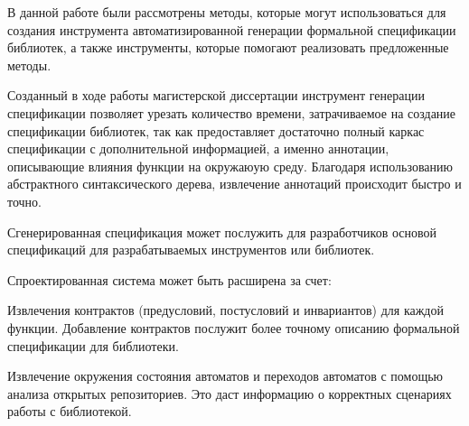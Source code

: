 \conclusion

В данной работе были рассмотрены методы, которые могут использоваться для создания инструмента автоматизированной генерации формальной спецификации библиотек, а также инструменты, которые помогают реализовать предложенные методы.

Созданный в ходе работы магистерской диссертации инструмент генерации спецификации позволяет урезать количество времени, затрачиваемое на создание спецификации библиотек, так как предоставляет достаточно полный каркас спецификации с дополнительной информацией, а именно аннотации, описывающие влияния функции на окружаюую среду.
Благодаря использованию абстрактного синтаксического дерева, извлечение аннотаций происходит быстро и точно.

Сгенерированная спецификация может послужить для разработчиков основой спецификаций для разрабатываемых инструментов или библиотек.

Спроектированная система может быть расширена за счет:
%
\begin{itemize*}
\item Извлечения контрактов (предусловий, постусловий и инвариантов) для каждой функции. Добавление контрактов послужит более точному описанию формальной спецификации для библиотеки.
\item Извлечение окружения состояния автоматов и переходов автоматов с помощью анализа открытых репозиториев. Это даст информацию о корректных сценариях работы с библиотекой.
\end{itemize*}
%